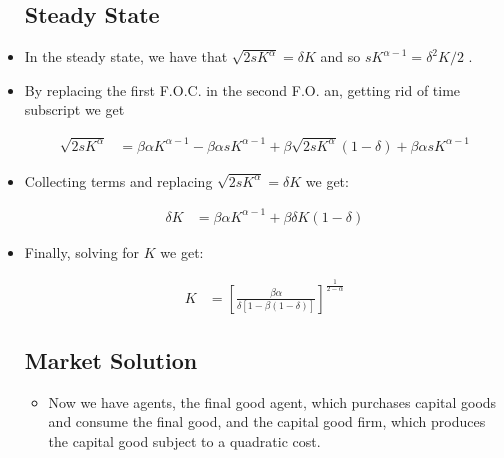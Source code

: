 \documentclass[11pt]{article}
\numberwithin{equation}{section}
\begin{document}
\begin{itemize}
%	
	\subsection{Steady State}
	
	\item In the steady state, we have that $\sqrt{2 s K^\alpha} = \delta K$ and so $s K^{\alpha-1} =\delta^2 K/2$ .
	
	\item By replacing the first F.O.C. in the second F.O. an, getting rid of time subscript we get
	
	\begin{align} \sqrt{2 s K^\alpha}& = \beta \alpha K^{\alpha-1}  - \beta \alpha s K^{\alpha-1} +\beta \sqrt{2 s K^\alpha} (1-\delta) + \beta \alpha s  K^{\alpha-1}
	\end{align}
	
	\item Collecting terms and replacing $\sqrt{2 s K^\alpha} = \delta K$ we get:
	
	\begin{align} \delta K & = \beta \alpha K^{\alpha-1} +\beta \delta K (1-\delta) 
	\end{align}
	
	\item Finally, solving for $K$ we get:
	
		\begin{align}  K & = \left[\frac{\beta \alpha}{\delta[1-\beta(1-\delta)]} \right]^\frac{1}{2-\alpha}
	\end{align}
	
	
	\subsection{Market Solution}
	
	\begin{itemize}
		\item Now we have agents, the final good agent, which purchases capital goods and consume the final good, and the capital good firm, which produces the capital good subject to a quadratic cost. 
	\end{itemize}
	

\end{itemize}
\end{document}

